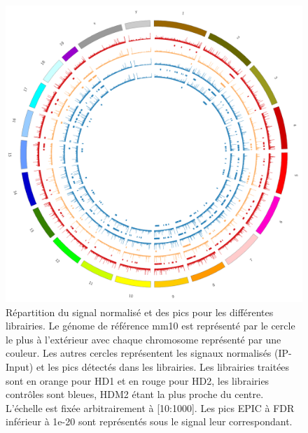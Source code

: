 \documentclass[a4paper,12pt,times]{report}
\newcommand{\scaption}[1]{\caption{\footnotesize{#1}}}
\begin{document}
    \begin{figure}[!h]
    \centering
    \includegraphics[scale=0.2]{circos_signal_rgunique_peaks_10-100_e20.png}
    \scaption{Répartition du signal normalisé  et des pics pour les différentes librairies.
     Le génome de référence mm10 est représenté par le cercle le plus à l'extérieur avec chaque chromosome représenté par une couleur. 
     Les autres cercles représentent les signaux normalisés (IP-Input) et les pics détectés dans les librairies. Les librairies traitées sont en orange pour HD1 et en rouge pour HD2, les librairies contrôles sont bleues, HDM2 étant la plus proche du centre.
    L'échelle est fixée arbitrairement à [10:1000]. Les pics EPIC à FDR inférieur à 1e-20 sont représentés sous le signal leur correspondant. }
    \label{circoss}
    \end{figure}
    
\end{document}
